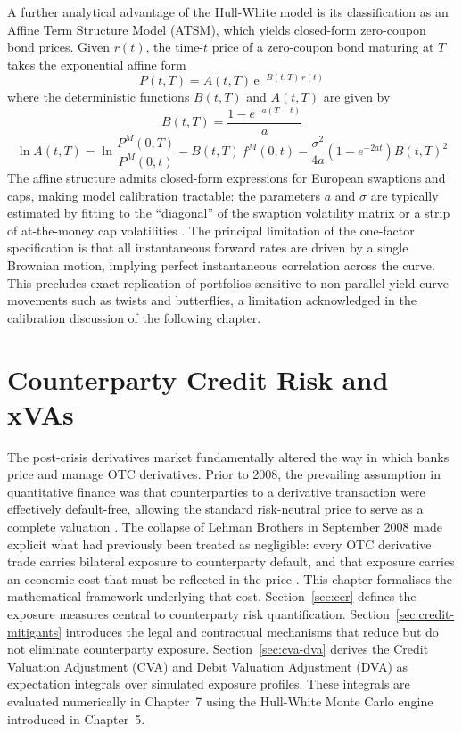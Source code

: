     \noindent
    A further analytical advantage of the Hull-White model is its classification as an Affine Term Structure Model (ATSM), which yields closed-form zero-coupon bond prices. Given $r(t)$, the time-$t$ price of a zero-coupon bond maturing at $T$ takes the exponential affine form
    \begin{equation}
        P(t,T) = A(t,T)\,\mathrm{e}^{-B(t,T)\,r(t)}
    \end{equation}
    where the deterministic functions $B(t,T)$ and $A(t,T)$ are given by \cite{brigo2001interest}
    \begin{equation}\label{eq:hw-B}
        B(t,T) = \frac{1 - e^{-a(T-t)}}{a}
    \end{equation}
    \begin{equation}\label{eq:hw-lnA}
        \ln A(t,T) = \ln\frac{P^M(0,T)}{P^M(0,t)} - B(t,T)\,f^M(0,t)
                   - \frac{\sigma^2}{4a}\!\left(1 - e^{-2at}\right)B(t,T)^2
    \end{equation}
    The affine structure admits closed-form expressions for European swaptions and caps, making model calibration tractable: the parameters $a$ and $\sigma$ are typically estimated by fitting to the ``diagonal'' of the swaption volatility matrix or a strip of at-the-money cap volatilities \cite{brigo2001interest}. The principal limitation of the one-factor specification is that all instantaneous forward rates are driven by a single Brownian motion, implying perfect instantaneous correlation across the curve. This precludes exact replication of portfolios sensitive to non-parallel yield curve movements such as twists and butterflies, a limitation acknowledged in the calibration discussion of the following chapter.

    \chapter{Counterparty Credit Risk and xVAs}

    \noindent
    The post-crisis derivatives market fundamentally altered the way in which banks price and manage OTC derivatives. Prior to 2008, the prevailing assumption in quantitative finance was that counterparties to a derivative transaction were effectively default-free, allowing the standard risk-neutral price to serve as a complete valuation \cite{Green_2016}. The collapse of Lehman Brothers in September 2008 made explicit what had previously been treated as negligible: every OTC derivative trade carries bilateral exposure to counterparty default, and that exposure carries an economic cost that must be reflected in the price \cite{Gregory_2015}. This chapter formalises the mathematical framework underlying that cost. Section~\ref{sec:ccr} defines the exposure measures central to counterparty risk quantification. Section~\ref{sec:credit-mitigants} introduces the legal and contractual mechanisms that reduce but do not eliminate counterparty exposure. Section~\ref{sec:cva-dva} derives the Credit Valuation Adjustment (CVA) and Debit Valuation Adjustment (DVA) as expectation integrals over simulated exposure profiles. These integrals are evaluated numerically in Chapter~7 using the Hull-White Monte Carlo engine introduced in Chapter~5.


